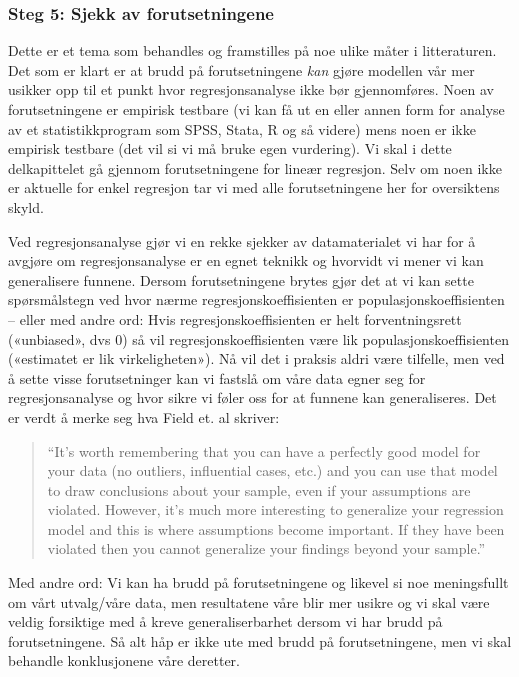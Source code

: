 \documentclass[
]{article}
\begin{document}
\hypertarget{steg-5-sjekk-av-forutsetningene}{%
\subsubsection{Steg 5: Sjekk av forutsetningene}\label{steg-5-sjekk-av-forutsetningene}}

Dette er et tema som behandles og framstilles på noe ulike måter i litteraturen. Det som er klart er at brudd på forutsetningene \emph{kan} gjøre modellen vår mer usikker opp til et punkt hvor regresjonsanalyse ikke bør gjennomføres. Noen av forutsetningene er empirisk testbare (vi kan få ut en eller annen form for analyse av et statistikkprogram som SPSS, Stata, R og så videre) mens noen er ikke empirisk testbare (det vil si vi må bruke egen vurdering). Vi skal i dette delkapittelet gå gjennom forutsetningene for lineær regresjon. Selv om noen ikke er aktuelle for enkel regresjon tar vi med alle forutsetningene her for oversiktens skyld.

Ved regresjonsanalyse gjør vi en rekke sjekker av datamaterialet vi har for å avgjøre om regresjonsanalyse er en egnet teknikk og hvorvidt vi mener vi kan generalisere funnene. Dersom forutsetningene brytes gjør det at vi kan sette spørsmålstegn ved hvor nærme regresjonskoeffisienten er populasjonskoeffisienten -- eller med andre ord: Hvis regresjonskoeffisienten er helt forventningsrett («unbiased», dvs 0) så vil regresjonskoeffisienten være lik populasjonskoeffisienten («estimatet er lik virkeligheten»). Nå vil det i praksis aldri være tilfelle, men ved å sette visse forutsetninger kan vi fastslå om våre data egner seg for regresjonsanalyse og hvor sikre vi føler oss for at funnene kan generaliseres. Det er verdt å merke seg hva Field et. al \citeyearpar[s.298]{fieldDiscoveringStatisticsUsing2012} skriver:

\begin{quote}
``It's worth remembering that you can have a perfectly good model for your data (no outliers, influential cases, etc.) and you can use that model to draw conclusions about your sample, even if your assumptions are violated. However, it's much more interesting to generalize your regression model and this is where assumptions become important. If they have been violated then you cannot generalize your findings beyond your sample.''
\end{quote}

Med andre ord: Vi kan ha brudd på forutsetningene og likevel si noe meningsfullt om vårt utvalg/våre data, men resultatene våre blir mer usikre og vi skal være veldig forsiktige med å kreve generaliserbarhet dersom vi har brudd på forutsetningene. Så alt håp er ikke ute med brudd på forutsetningene, men vi skal behandle konklusjonene våre deretter.
\end{document}

